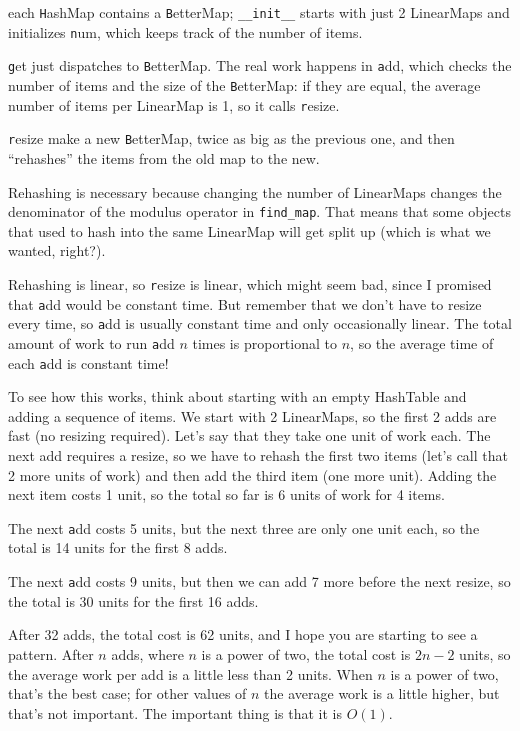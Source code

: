 \documentclass[
DIV=11,
fontsize=12,
twoside,
headinclude=false,
titlepage=firstiscover,
abstract=true,
headsepline=true,
footsepline=true,
chapterprefix=true, %
headings=big,
bibliography=totoc,%
captions=tableheading
]{scrbook}
\theoremstyle{definition}
\begin{document}
each {\texttt HashMap} contains a {\texttt BetterMap}; \verb"__init__" starts
with just 2 LinearMaps and initializes {\texttt num}, which keeps track of
the number of items.

{\texttt get} just dispatches to {\texttt BetterMap}.  The real work happens
in {\texttt add}, which checks the number of items and the size of the
{\texttt BetterMap}: if they are equal, the average number of items per
LinearMap is 1, so it calls {\texttt resize}.

{\texttt resize} make a new {\texttt BetterMap}, twice as big as the previous
one, and then ``rehashes'' the items from the old map to the new.

Rehashing is necessary because changing the number of LinearMaps
changes the denominator of the modulus operator in
\verb"find_map".  That means that some objects that used
to hash into the same LinearMap will get split up (which is
what we wanted, right?).

Rehashing is linear, so
{\texttt resize} is linear, which might seem bad, since I promised
that {\texttt add} would be constant time.  But remember that
we don't have to resize every time, so {\texttt add} is usually
constant time and only occasionally linear.  The total amount
of work to run {\texttt add} $n$ times is proportional to $n$,
so the average time of each {\texttt add} is constant time!

To see how this works, think about starting with an empty
HashTable and adding a sequence of items.  We start with 2 LinearMaps,
so the first 2 adds are fast (no resizing required).  Let's
say that they take one unit of work each.  The next add
requires a resize, so we have to rehash the first two
items (let's call that 2 more units of work) and then
add the third item (one more unit).  Adding the next item
costs 1 unit, so the total so far is
6 units of work for 4 items.

The next {\texttt add} costs 5 units, but the next three
are only one unit each, so the total is 14 units for the
first 8 adds.

The next {\texttt add} costs 9 units, but then we can add 7 more
before the next resize, so the total is 30 units for the
first 16 adds.

After 32 adds, the total cost is 62 units, and I hope you are starting
to see a pattern.  After $n$ adds, where $n$ is a power of two, the
total cost is $2n-2$ units, so the average work per add is
a little less than 2 units.  When $n$ is a power of two, that's
the best case; for other values of $n$ the average work is a little
higher, but that's not important.  The important thing is that it
is $O(1)$.
\end{document}
